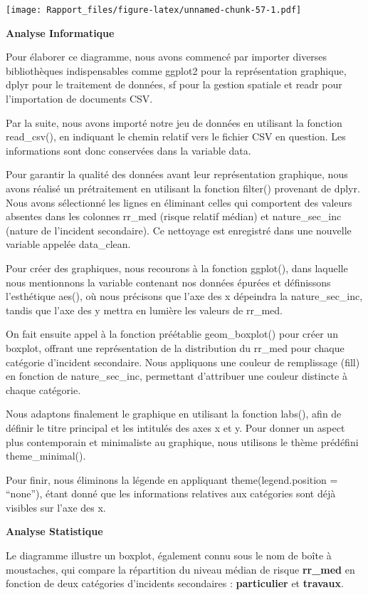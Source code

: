 \documentclass[
]{article}
\begin{document}
\texttt{[image: Rapport\_files/figure-latex/unnamed-chunk-57-1.pdf]}

\textbf{Analyse Informatique}

Pour élaborer ce diagramme, nous avons commencé par importer diverses
bibliothèques indispensables comme ggplot2 pour la représentation
graphique, dplyr pour le traitement de données, sf pour la gestion
spatiale et readr pour l'importation de documents CSV.

Par la suite, nous avons importé notre jeu de données en utilisant la
fonction read\_csv(), en indiquant le chemin relatif vers le fichier CSV
en question. Les informations sont donc conservées dans la variable
data.

Pour garantir la qualité des données avant leur représentation
graphique, nous avons réalisé un prétraitement en utilisant la fonction
filter() provenant de dplyr. Nous avons sélectionné les lignes en
éliminant celles qui comportent des valeurs absentes dans les colonnes
rr\_med (risque relatif médian) et nature\_sec\_inc (nature de
l'incident secondaire). Ce nettoyage est enregistré dans une nouvelle
variable appelée data\_clean.

Pour créer des graphiques, nous recourons à la fonction ggplot(), dans
laquelle nous mentionnons la variable contenant nos données épurées et
définissons l'esthétique aes(), où nous précisons que l'axe des x
dépeindra la nature\_sec\_inc, tandis que l'axe des y mettra en lumière
les valeurs de rr\_med.

On fait ensuite appel à la fonction préétablie geom\_boxplot() pour
créer un boxplot, offrant une représentation de la distribution du
rr\_med pour chaque catégorie d'incident secondaire. Nous appliquons une
couleur de remplissage (fill) en fonction de nature\_sec\_inc,
permettant d'attribuer une couleur distincte à chaque catégorie.

Nous adaptons finalement le graphique en utilisant la fonction labs(),
afin de définir le titre principal et les intitulés des axes x et y.
Pour donner un aspect plus contemporain et minimaliste au graphique,
nous utilisons le thème prédéfini theme\_minimal().

Pour finir, nous éliminons la légende en appliquant
theme(legend.position = ``none''), étant donné que les informations
relatives aux catégories sont déjà visibles sur l'axe des x.

\textbf{Analyse Statistique}

Le diagramme illustre un boxplot, également connu sous le nom de boîte à
moustaches, qui compare la répartition du niveau médian de risque
\textbf{rr\_med} en fonction de deux catégories d'incidents secondaires
: \textbf{particulier} et \textbf{travaux}.
\end{document}
